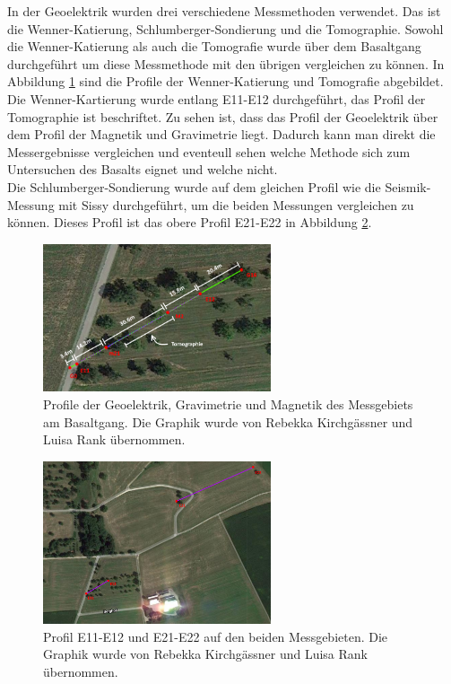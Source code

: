 
In der Geoelektrik wurden drei verschiedene Messmethoden verwendet. Das ist die Wenner-Katierung, Schlumberger-Sondierung und die Tomographie. Sowohl die Wenner-Katierung als auch die Tomografie wurde über dem Basaltgang durchgeführt um diese Messmethode mit den übrigen vergleichen zu können. In Abbildung \ref{abb:PBasalt} sind die Profile der Wenner-Katierung und Tomografie abgebildet. Die Wenner-Kartierung wurde entlang E11-E12 durchgeführt, das Profil der Tomographie ist beschriftet. Zu sehen ist, dass das Profil der Geoelektrik über dem Profil der Magnetik und Gravimetrie liegt. Dadurch kann man direkt die Messergebnisse vergleichen und eventeull sehen welche Methode sich zum Untersuchen des Basalts eignet und welche nicht.\\
Die Schlumberger-Sondierung wurde auf dem gleichen Profil wie die Seismik-Messung mit Sissy durchgeführt, um die beiden Messungen vergleichen zu können. Dieses Profil ist das obere Profil E21-E22 in Abbildung \ref{abb:PWiese}.


\begin{figure}[h]
\centering
\includegraphics[width=0.6\textwidth]{fig/ElektrikMagnetikGravimetrie0gps.png}
\caption[Profile der Geoelektrik, Gravimetrie und Magnetik des Messgebiets am Basaltgang]{Profile der Geoelektrik, Gravimetrie und Magnetik des Messgebiets am Basaltgang. Die Graphik wurde von Rebekka Kirchgässner und Luisa Rank übernommen.}
\label{abb:PBasalt}
\end{figure}

\begin{figure}[h]
\centering
\includegraphics[width=0.6\textwidth]{fig/profilegps.PNG}
\caption[Profil E11-E12 und E21-E22 auf den beiden Messgebieten]{Profil E11-E12 und E21-E22 auf den beiden Messgebieten. Die Graphik wurde von Rebekka Kirchgässner und Luisa Rank übernommen.}
\label{abb:PWiese}
\end{figure}
\newpage

